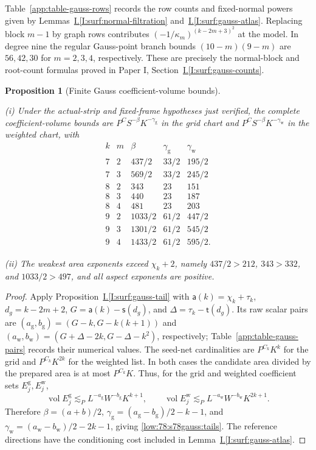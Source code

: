 \documentclass[11pt]{amsart}
\newtheorem{proposition}[theorem]{Proposition}
\theoremstyle{definition}
\theoremstyle{remark}
\numberwithin{equation}{section}
\newcommand{\partIref}[1]{\hyperref[I:#1]{I.\ref*{I:#1}}}
\begin{document}
Table~\ref{app:table-gauss-rows} records the row counts and fixed-normal powers given by Lemmas~\partIref{surf:normal-filtration} and~\partIref{surf:gauss-atlas}. Replacing block $m-1$ by graph rows contributes $(-1/\kappa_m)^{(k-2m+3)^2}$ at the model. In degree nine the regular Gauss-point branch bounds $(10-m)(9-m)$ are $56,42,30$ for $m=2,3,4$, respectively. These are precisely the normal-block and root-count formulas proved in Paper I, Section~\partIref{surf:gauss-counts}.

\begin{proposition}[Finite Gauss coefficient-volume bounds]\label{low:9:u9:gauss-tails}

\noindent\textup{(i)} Under the actual-strip and fixed-frame hypotheses just verified, the complete coefficient-volume bounds are $P^CS^{-\beta}K^{-\gamma_{\mathrm g}}$ in the grid chart and $P^CS^{-\beta}K^{-\gamma_{\mathrm w}}$ in the weighted chart, with
\begin{equation}\label{low:78:s78gauss:tails}
\begin{array}{c|c|r|r|r}
k&m&\beta&\gamma_{\mathrm g}&\gamma_{\mathrm w}\\\hline
7&2&437/2&33/2&195/2\\
7&3&569/2&33/2&245/2\\
8&2&343&23&151\\
8&3&440&23&187\\
8&4&481&23&203\\
9&2&1033/2&61/2&447/2\\
9&3&1301/2&61/2&545/2\\
9&4&1433/2&61/2&595/2.
\end{array}
\end{equation}

\noindent\textup{(ii)} The weakest area exponents exceed $\chi_k+2$, namely $437/2>212$, $343>332$, and $1033/2>497$, and all aspect exponents are positive.
\end{proposition}
\begin{proof}
Apply Proposition~\partIref{surf:gauss-tail} with $\mathsf a(k)=\chi_k+\tau_k$, $d_g=k-2m+2$, $G=\mathsf a(k)-\mathsf s(d_g)$, and $\Delta=\tau_k-\mathsf t(d_g)$. Its raw scalar pairs are $(a_{\mathrm g},b_{\mathrm g})=(G-k,G-k(k+1))$ and $(a_{\mathrm w},b_{\mathrm w})=(G+\Delta-2k,G-\Delta-k^2)$, respectively; Table~\ref{app:table-gauss-pairs} records their numerical values. The seed-net cardinalities are $P^{C_k}K^k$ for the grid and $P^{C_k}K^{2k}$ for the weighted list. In both cases the candidate area divided by the prepared area is at most $P^{C_k}K$. Thus, for the grid and weighted coefficient sets $E_j^{\mathrm g},E_j^{\mathrm w}$,
\[
\operatorname{vol}E_j^{\mathrm g}\lesssim_P L^{-a_{\mathrm g}}W^{-b_{\mathrm g}}K^{k+1},\qquad \operatorname{vol}E_j^{\mathrm w}\lesssim_P L^{-a_{\mathrm w}}W^{-b_{\mathrm w}}K^{2k+1}.
\]
Therefore $\beta=(a+b)/2$, $\gamma_{\mathrm g}=(a_{\mathrm g}-b_{\mathrm g})/2-k-1$, and $\gamma_{\mathrm w}=(a_{\mathrm w}-b_{\mathrm w})/2-2k-1$, giving \eqref{low:78:s78gauss:tails}. The reference directions have the conditioning cost included in Lemma~\partIref{surf:gauss-atlas}.
\end{proof}
\end{document}
